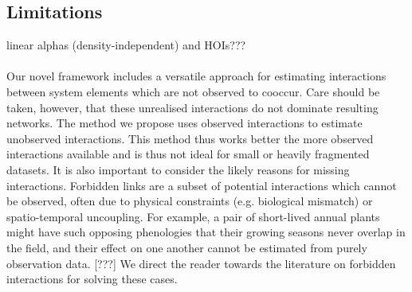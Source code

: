\documentclass[a4,12pt]{article}
\begin{document}
     


   \subsection{Limitations}


   linear alphas (density-independent) and HOIs???
        
        \paragraph{}
        Our novel framework includes a versatile approach for estimating interactions between system elements which are not observed to cooccur. Care should be taken, however, that these unrealised interactions do not dominate resulting networks. The method we propose uses observed interactions to estimate unobserved interactions. This method thus works better the more observed interactions available and is thus not ideal for small or heavily fragmented datasets. It is also important to consider the likely reasons for missing interactions. Forbidden links are a subset of potential interactions which cannot be observed, often due to physical constraints (e.g. biological mismatch) or spatio-temporal uncoupling. For example, a pair of short-lived annual plants might have such opposing phenologies that their growing seasons never overlap in the field, and their effect on one another cannot be estimated from purely observation data. [???] We direct the reader towards the literature on forbidden interactions \parencite{Olesen2011, Jordano2016} for solving these cases. 
\end{document}
